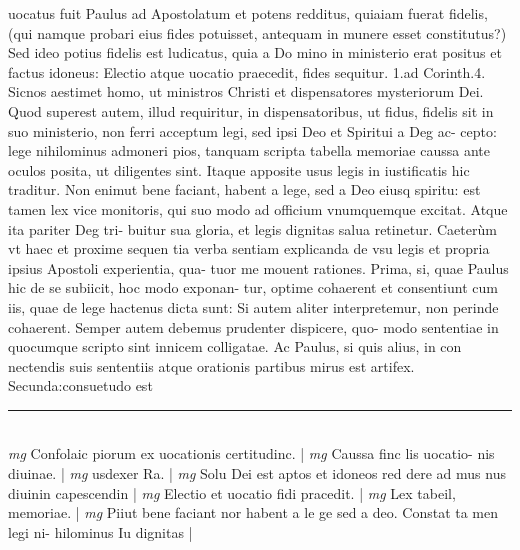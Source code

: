\documentclass{article}
\begin{document}
\begin{pages}
uocatus fuit Paulus ad Apostolatum et potens redditus, quiaiam fuerat fidelis, (qui namque  probari eius fides potuisset, antequam in munere esset constitutus?) Sed ideo potius fidelis est ludicatus, quia a Do mino in ministerio erat positus et factus idoneus: Electio atque  uocatio praecedit, fides sequitur. 1.ad Corinth.4. Sicnos aestimet homo, ut ministros Christi et dispensatores mysteriorum Dei. Quod superest autem, illud requiritur, in dispensatoribus, ut fidus, fidelis sit in suo ministerio, non ferri acceptum legi, sed ipsi Deo et Spiritui a Deg ac- cepto: lege nihilominus admoneri pios, tanquam scripta tabella memoriae caussa ante oculos posita, ut diligentes sint. Itaque  apposite usus legis in iustificatis hic traditur. Non enimut bene faciant, habent a lege, sed a Deo eiusq spiritu: est tamen lex vice monitoris, qui suo modo ad officium vnumquemque  excitat. Atque ita pariter Deg tri- buitur sua gloria, et legis dignitas salua retinetur. Caeterùm vt haec et proxime sequen tia verba sentiam explicanda de vsu legis et propria ipsius Apostoli experientia, qua- tuor me mouent rationes. Prima, si, quae Paulus hic de se subiicit, hoc modo exponan- tur, optime cohaerent et consentiunt cum iis, quae de lege hactenus dicta sunt: Si autem aliter interpretemur, non perinde cohaerent. Semper autem debemus prudenter dispicere, quo- modo sententiae in quocumque  scripto sint innicem colligatae. Ac Paulus, si quis alius, in con nectendis suis sententiis atque  orationis partibus mirus est artifex. Secunda:consuetudo est  \pend
\vspace{0.5cm}\noindent
\vspace{0.2cm}\rule{1cm}{0.2pt}\\ 
\hspace{0.2cm}\textit{mg}
\footnotesize Confolaic piorum ex uocationis certitudinc. 
\normalsize| 
\hspace{0.2cm}\textit{mg}
\footnotesize Caussa finc lis uocatio- nis diuinae. 
\normalsize| 
\hspace{0.2cm}\textit{mg}
\footnotesize usdexer Ra. 
\normalsize| 
\hspace{0.2cm}\textit{mg}
\footnotesize Solu Dei est aptos et idoneos red dere ad mus nus diuinin capescendin 
\normalsize| 
\hspace{0.2cm}\textit{mg}
\footnotesize Electio et uocatio fidi pracedit. 
\normalsize| 
\hspace{0.2cm}\textit{mg}
\footnotesize Lex tabeil, memoriae. 
\normalsize| 
\hspace{0.2cm}\textit{mg}
\footnotesize Piiut bene faciant nor habent a le ge sed a deo. Constat ta men legi ni- hilominus Iu dignitas 
\normalsize| 

\end{pages}
\end{document}
